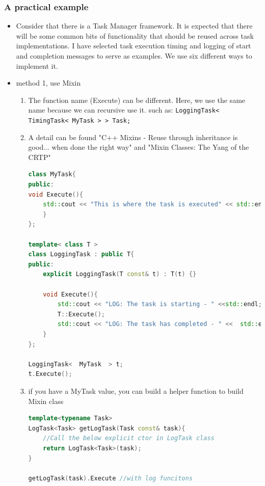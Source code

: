 \documentclass[a4paper,11pt,twoside]{book}
\begin{document}
\subsubsection{A practical example}
\begin{itemize}
	\item  Consider that there is a Task Manager framework. It is expected that there will be some common bits of functionality that should be reused across task implementations. I have selected task execution timing and logging of start and completion messages to serve as examples. We use six different ways to implement it.
	
	\item method 1, use Mixin
	\begin{enumerate}
		
		\item The function name (Execute) can be different. Here, we use the same name because we can recursive use it. such as: \texttt{LoggingTask< TimingTask< MyTask > > Task;}
		
		\item A detail can be found "C++ Mixins - Reuse through inheritance is good... when done the right way" and "Mixin Classes: The Yang of the CRTP"
		
\begin{lstlisting}[frame=single, language=c++]
class MyTask{
public:
void Execute(){
	std::cout << "This is where the task is executed" << std::endl;
	}
};
		
template< class T >
class LoggingTask : public T{
public:
	explicit LoggingTask(T const& t) : T(t) {}
			
	void Execute(){
		std::cout << "LOG: The task is starting - " <<std::endl;
		T::Execute(); 
		std::cout << "LOG: The task has completed - " <<  std::endl;
	}
};
		
LoggingTask<  MyTask  > t;
t.Execute();
\end{lstlisting}
		
		\item if you have a MyTask value, you can build a helper function to build Mixin class 
\begin{lstlisting}[frame=single, language=c++]
template<typename Task>
LogTask<Task> getLogTask(Task const& task){
	//Call the below explicit ctor in LogTask class
	return LogTask<Task>(task);
}
		
getLogTask(task).Execute //with log funcitons
\end{lstlisting}
		
	\end{enumerate}
	

\end{itemize}
\end{document}
